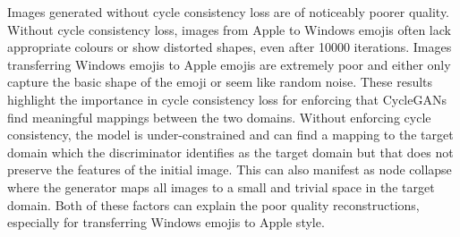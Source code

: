 \documentclass[12pt,letterpaper]{article} %
\begin{document}
Images generated without cycle consistency loss are of noticeably poorer quality. Without cycle consistency loss, images from Apple to Windows emojis often lack appropriate colours or show distorted shapes, even after 10000 iterations. Images transferring Windows emojis to Apple emojis are extremely poor and either only capture the basic shape of the emoji or seem like random noise. These results highlight the importance in cycle consistency loss for enforcing that CycleGANs find meaningful mappings between the two domains. Without enforcing cycle consistency, the model is under-constrained and can find a mapping to the target domain which the discriminator identifies as the target domain but that does not preserve the features of the initial image. This can also manifest as node collapse where the generator maps all images to a small and trivial space in the target domain. Both of these factors can explain the poor quality reconstructions, especially for transferring Windows emojis to Apple style. 
\end{document}
